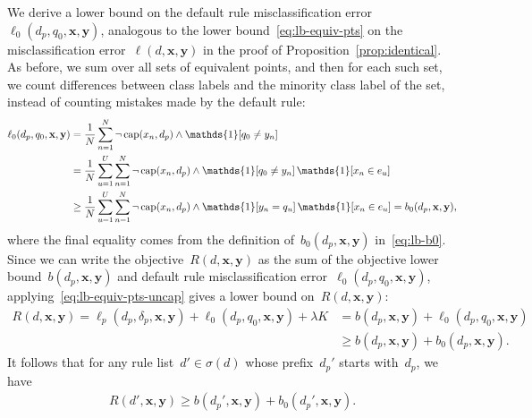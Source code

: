 \documentclass[twoside,11pt]{article}
\def\one{\mathds{1}}
\newcommand{\x}{\mathbf{x}}
\newcommand{\y}{\mathbf{y}}
\def\RL{{d}}
\def\Prefix{d_p}
\def\Labels{\delta_p}
\def\Default{q_0}
\def\Obj{R}
\def\Loss{\ell}
\def\Reg{{\lambda}}
\def\Cap{\textnormal{cap}}
\def\StartsWith{\sigma}
\def\one{\mathds{1}}
\newcommand{\nn}{\nonumber}
\begin{document}
We derive a lower bound on the default rule
misclassification error~$\Loss_0(\Prefix, \Default, \x, \y)$,
analogous to the lower bound~\eqref{eq:lb-equiv-pts} on the misclassification
error~$\Loss(\RL, \x, \y)$ in the proof of Proposition~\ref{prop:identical}.
%
As before, we sum over all sets of equivalent points, and then for each such set,
we count differences between class labels and the minority class label of the set,
instead of counting mistakes made by the default rule:
\begin{align}
\Loss_0(\Prefix, \Default, \x, \y)
&= \frac{1}{N} \sum_{n=1}^N \neg\, \Cap(x_n, \Prefix) \wedge \one [ q_0 \neq y_n ] \nn \\
&= \frac{1}{N} \sum_{u=1}^U \sum_{n=1}^N \neg\, \Cap(x_n, \Prefix) \wedge
  \one [ q_0 \neq y_n ]\, \one [ x_n \in e_u ] \nn \\
&\ge \frac{1}{N} \sum_{u=1}^U \sum_{n=1}^N \neg\, \Cap(x_n, \Prefix) \wedge
  \one [ y_n = q_u ]\, \one [ x_n \in e_u ] = b_0(\Prefix, \x, \y),
\label{eq:lb-equiv-pts-uncap}
\end{align}
where the final equality comes from the definition of~$b_0(\Prefix, \x, \y)$ in~\eqref{eq:lb-b0}.
%
Since we can write the objective~$\Obj(\RL, \x, \y)$
as the sum of the objective lower bound~$b(\Prefix, \x, \y)$ and
default rule misclassification error~$\Loss_0(\Prefix, \Default, \x, \y)$,
applying~\eqref{eq:lb-equiv-pts-uncap} gives a lower bound on~$\Obj(\RL, \x, \y)$:
\begin{align}
\Obj(\RL, \x, \y)
= \Loss_p(\Prefix, \Labels, \x, \y) + \Loss_0(\Prefix, \Default, \x, \y) + \Reg K
&= b(\Prefix, \x, \y) + \Loss_0(\Prefix, \Default, \x, \y) \nn \\
&\ge b(\Prefix, \x, \y) + b_0(\Prefix, \x, \y).
\label{eq:equiv-pts-base}
\end{align}
It follows that for any rule list~${\RL' \in \StartsWith(\RL)}$ whose prefix~$\Prefix'$
starts with~$\Prefix$, we have
\begin{align}
\Obj(\RL', \x, \y) \ge b(\Prefix', \x, \y) + b_0(\Prefix', \x, \y).
\label{eq:equiv-pts-extend}
\end{align}
\end{document}
